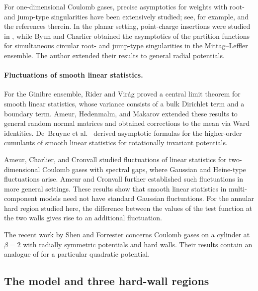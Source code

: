 \documentclass[a4paper]{article}
\numberwithin{equation}{section}
\begin{document}
For one-dimensional Coulomb gases, precise asymptotics for weights with root- and jump-type singularities have been extensively studied; see, for example, \cite{C2019,CG2021,FisherHartwig,DIK} and the references therein. In the planar setting, point-charge insertions were studied in \cite{B2025,BCMS2025,BSY2025,BYY2026,BFKL25,BFL25}, while Byun and Charlier \cite{BC2022} obtained the asymptotics of the partition functions for simultaneous circular root- and jump-type singularities in the Mittag--Leffler ensemble. The author \cite{Noda2025} extended their results to general radial potentials.


\paragraph{Fluctuations of smooth linear statistics.}
For the Ginibre ensemble, Rider and Vir\'{a}g \cite{RV2007} proved a central limit theorem for smooth linear statistics, whose variance consists of a bulk Dirichlet term and a boundary term. Ameur, Hedenmalm, and Makarov \cite{AHM2011,AHM2015} extended these results to general random normal matrices and obtained corrections to the mean via Ward identities. De~Bruyne et al.\ \cite{DDMS2024} derived asymptotic formulas for the higher-order cumulants of smooth linear statistics for rotationally invariant potentials.

Ameur, Charlier, and Cronvall \cite{ACC2023a,ACC2023c} studied fluctuations of linear statistics for two-dimensional Coulomb gases with spectral gaps, where Gaussian and Heine-type fluctuations arise. Ameur and Cronvall \cite{AC2026} further established such fluctuations in more general settings. These results show that smooth linear statistics in multi-component models need not have standard Gaussian fluctuations. For the annular hard region studied here, the difference between the values of the test function at the two walls gives rise to an additional fluctuation. 



The recent work \cite{SF2026} by Shen and Forrester concerns Coulomb gases on a cylinder at $\beta=2$ with radially symmetric potentials and hard walls. Their results contain an analogue of \cite[Theorem~1.9 with $g=2$]{C2021} for a particular quadratic potential. 



\subsection{The model and three hard-wall regions}
\end{document}

